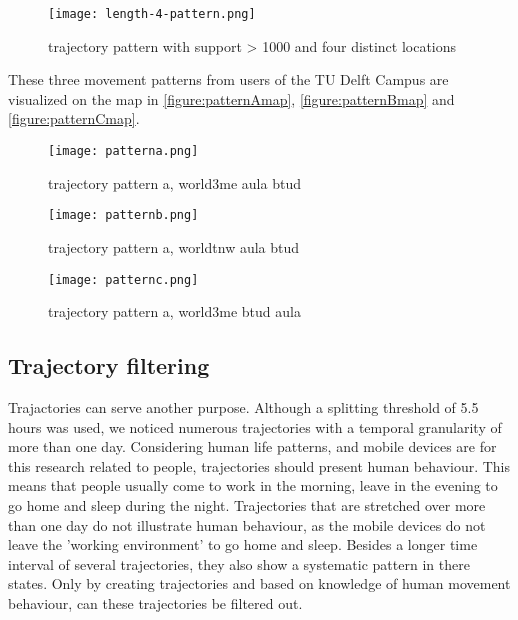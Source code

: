 \begin{figure}[H]
\centering
\texttt{[image: length-4-pattern.png]}
\captionsetup{justification=centering}
\caption{trajectory pattern with support > 1000 and four distinct locations}
\label{figure:len4pattern}
\end{figure}

These three movement patterns from users of the TU Delft Campus are visualized on the map in \autoref{figure:patternAmap}, \autoref{figure:patternBmap} and \autoref{figure:patternCmap}.

\begin{figure}[H]
\centering
\texttt{[image: patterna.png]}
\captionsetup{justification=centering}
\caption{trajectory pattern a, world\rightarrow 3me \rightarrow aula \rightarrow btud}
\label{figure:patternAmap}
\end{figure}

\begin{figure}[H]
\centering
\texttt{[image: patternb.png]}
\captionsetup{justification=centering}
\caption{trajectory pattern a, world\rightarrow tnw \rightarrow aula \rightarrow btud}
\label{figure:patternBmap}
\end{figure}

\begin{figure}[H]
\centering
\texttt{[image: patternc.png]}
\captionsetup{justification=centering}
\caption{trajectory pattern a, world\rightarrow 3me \rightarrow btud \rightarrow aula}
\label{figure:patternCmap}
\end{figure}

\subsection{Trajectory filtering}
Trajactories can serve another purpose. Although a splitting threshold of 5.5 hours was used, we noticed numerous trajectories with a temporal granularity of more than one day. Considering human life patterns, and mobile devices are for this research related to people, trajectories should present human behaviour. This means that people usually come to work in the morning, leave in the evening to go home and sleep during the night. Trajectories that are stretched over more than one day do not illustrate human behaviour, as the mobile devices do not leave the 'working environment' to go home and sleep. Besides a longer time interval of several trajectories, they also show a systematic pattern in there states. Only by creating trajectories and based on knowledge of human movement behaviour, can these trajectories be filtered out. 
